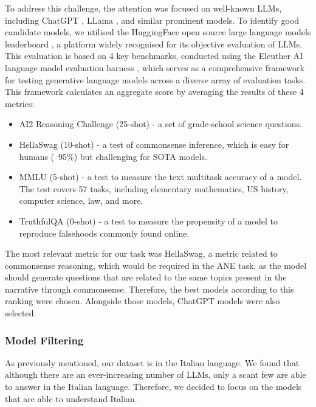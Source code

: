 To address this challenge, the attention was focused on well-known LLMs, including ChatGPT \cite{chatgpt}, LLama \cite{touvronllama}, and similar prominent models. To identify good candidate models, we utilised the HuggingFace open source large language models leaderboard \cite{huggingface-leaderboard}, a platform widely recognised for its objective evaluation of LLMs. This evaluation is based on 4 key benchmarks, conducted using the Eleuther AI language model evaluation harness \cite{eleuther}, which serves as a comprehensive framework for testing generative language models across a diverse array of evaluation tasks. This framework calculates an aggregate score by averaging the results of these 4 metrics:
\begin{itemize}
    \item {AI2 Reasoning Challenge (25-shot)} \cite{AI2} - a set of grade-school science questions.
    \item {HellaSwag (10-shot)} \cite{HellaSwag} - a test of commonsense inference, which is easy for humans (~95\%) but challenging for SOTA models.
    \item {MMLU (5-shot)} \cite{MMLU} - a test to measure the text multitask accuracy of a model. The test covers 57 tasks, including elementary mathematics, US history, computer science, law, and more.
    \item {TruthfulQA (0-shot)} \cite{Truthful} - a test to measure the propensity of a model to reproduce falsehoods commonly found online.
\end{itemize}
The most relevant metric for our task was HellaSwag, a metric related to commonsense reasoning, which would be required in the ANE task, as the model should generate questions that are related to the same topics present in the narrative through commonsense. Therefore, the best models according to this ranking were chosen. Alongside those models, ChatGPT models were also selected. 

\subsubsection{Model Filtering}
As previously mentioned, our dataset is in the Italian language. We found that although there are an ever-increasing number of LLMs, only a scant few are able to answer in the Italian language. Therefore, we decided to focus on the models that are able to understand Italian.


